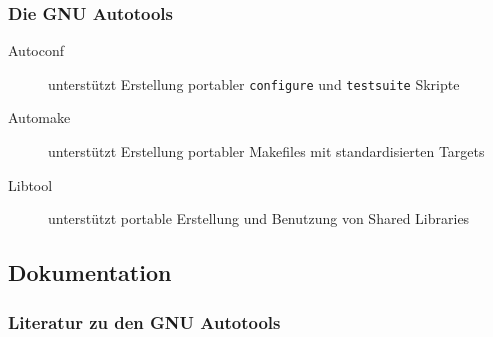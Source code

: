 \begin{frame}
	\frametitle{Die GNU Autotools}
	\begin{description}
		\item[Autoconf]	unterstützt Erstellung portabler \texttt{configure} und \texttt{testsuite} Skripte
		\item[Automake]	unterstützt Erstellung portabler Makefiles mit standardisierten Targets
		\item[Libtool] 	unterstützt portable Erstellung und Benutzung von Shared Libraries
	\end{description}
\end{frame}
%

\subsection{Dokumentation}
\begin{frame}
	\frametitle{Literatur zu den GNU Autotools}
\end{frame}
